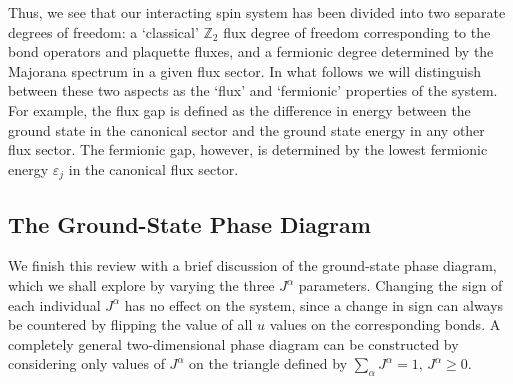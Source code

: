 Thus, we see that our interacting spin system has been divided into two separate degrees of freedom: a `classical' $\mathbb Z_2$ flux degree of freedom corresponding to the bond operators and plaquette fluxes, and a fermionic degree determined by the Majorana spectrum in a given flux sector. In what follows we will distinguish between these two aspects as the `flux' and `fermionic' properties of the system. For example, the flux gap is defined as the difference in energy between the ground state in the canonical sector and the ground state energy in any other flux sector. The fermionic gap, however, is determined by the lowest fermionic energy $\varepsilon_j$ in the canonical flux sector.

\subsection{The Ground-State Phase Diagram}

We finish this review with a brief discussion of the ground-state phase diagram, which we shall explore by varying the three $J^\alpha$ parameters. Changing the sign of each individual $J^\alpha$ has no effect on the system, since a change in sign can always be countered by flipping the value of all $u$ values on the corresponding bonds. A completely general two-dimensional phase diagram can be constructed by considering only values of $J^\alpha$ on the triangle defined by $\sum_\alpha J^\alpha = 1$, $J^\alpha \geq 0$. 

